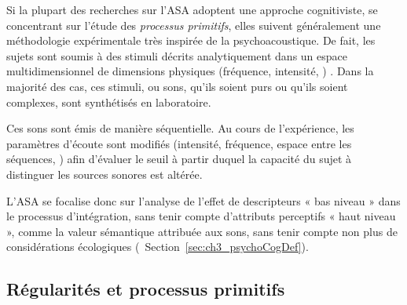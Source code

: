 Si la plupart des recherches sur l'ASA adoptent une approche cognitiviste, se concentrant sur l'étude des \emph{processus primitifs}, elles suivent généralement une méthodologie expérimentale très inspirée de la psychoacoustique. De fait, les sujets sont soumis à des stimuli décrits analytiquement dans un espace multidimensionnel de dimensions physiques (fréquence, intensité, \etc) \citep{dubois2006cognitive}. Dans la majorité des cas, ces stimuli, ou sons, qu'ils soient purs ou qu'ils soient complexes, sont synthétisés en laboratoire.

Ces sons sont émis de manière séquentielle. Au cours de l'expérience, les paramètres d'écoute sont modifiés (intensité, fréquence, espace entre les séquences, \etc) afin d'évaluer le seuil à partir duquel la capacité du sujet à distinguer les sources sonores est altérée.

L'ASA se focalise donc sur l'analyse de l'effet de descripteurs « bas niveau » dans le processus d'intégration, sans tenir compte d'attributs perceptifs « haut niveau », comme la valeur sémantique attribuée aux sons, sans tenir compte non plus de considérations écologiques (\cf~Section~\ref{sec:ch3_psychoCogDef}). 

\subsection{Régularités et processus primitifs}
\label{sec:ch3_regularitesEtProcessusPrimitifs}

